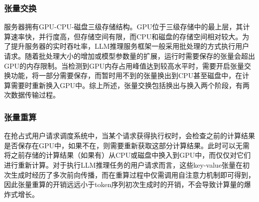 \subsubsection{张量交换}

服务器拥有GPU-CPU-磁盘三级存储结构。GPU位于三级存储中的最上层，其计算速率快，并行度高，但存储空间有限，而CPU和磁盘的存储空间相对较大。为了提升服务器的实时吞吐率，LLM推理服务框架一般采用批处理的方式执行用户请求。随着批处理大小的增加或模型参数量的扩展，运行时需要保存的张量会超出GPU的内存限制。当检测到GPU内存占用峰值达到较高水平时，需要开启张量交换功能，将一部分需要保存，而暂时用不到的张量换出到CPU甚至磁盘中，在计算需要时重新换入GPU中。综上所述，张量交换包括换出与换入两个阶段，有两次数据传输过程。

\subsubsection{张量重算}

在抢占式用户请求调度系统中，当某个请求获得执行权时，会检查之前的计算结果是否保存在GPU中，如果不在，则需要重新获取这部分计算结果。此时可以无需将之前存储的计算结果（如果有）从CPU或磁盘中换入到GPU中，而仅仅对它们进行重新计算。对于执行LLM推理任务的用户请求而言，这些key-value张量在初次生成时经历了多次前向传播，而在重算过程中仅需调用自注意力机制即可得到，因此张量重算的开销远远小于token序列初次生成时的开销，不会导致计算量的爆炸式增长。